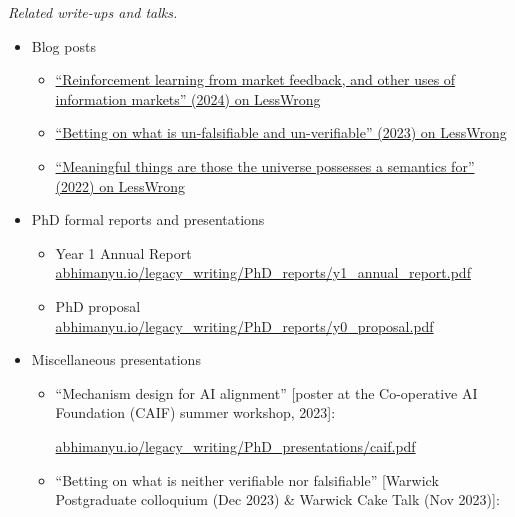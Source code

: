 \documentclass{article}
\newenvironment{relatedwork}
   {
     \begin{mdframed}[
       leftmargin=1cm,
       rightmargin=0cm,
       innerleftmargin=10pt,
       innerrightmargin=0pt,
       innertopmargin=0.5em,
       innerbottommargin=0.5em,
       linewidth=1pt,
       linecolor=gray,
       topline=false,
       bottomline=false,
       rightline=false
     ]
     \footnotesize
   }
   {
     \end{mdframed}
   }
\begin{document}
\begin{relatedwork}
    \emph{Related write-ups and talks.}
    \begin{itemize}[label=—]
        \item Blog posts
              \begin{itemize}
                  \item \href{https://www.lesswrong.com/posts/Y79tkWhvHi8GgLN2q/reinforcement-learning-from-market-feedback-and-other-uses}{``Reinforcement learning from market feedback, and other uses of information markets'' (2024) on LessWrong}
                  \item \href{https://www.lesswrong.com/posts/id84oe3LxdzoqinKA/betting-on-what-is-un-falsifiable-and-un-verifiable}{``Betting on what is un-falsifiable and un-verifiable'' (2023) on LessWrong}
                  \item \href{https://www.lesswrong.com/posts/xqxXrAohXSD3akYCg/meaningful-things-are-those-the-universe-possesses-a}{``Meaningful things are those the universe possesses a semantics for'' (2022) on LessWrong}
              \end{itemize}
        \item PhD formal reports and presentations
              \begin{itemize}
                  \item Year 1 Annual Report \href{https://abhimanyu.io/legacy_writing/PhD_reports/y1_annual_report.pdf}{abhimanyu.io/legacy\_writing/PhD\_reports/y1\_annual\_report.pdf}
                  \item PhD proposal \href{https://abhimanyu.io/legacy_writing/PhD_reports/y0_proposal.pdf}{abhimanyu.io/legacy\_writing/PhD\_reports/y0\_proposal.pdf}
              \end{itemize}
        \item Miscellaneous presentations
              \begin{itemize}
                  \item ``Mechanism design for AI alignment'' [poster at the Co-operative AI Foundation (CAIF) summer workshop, 2023]:

                        \href{https://abhimanyu.io/legacy_writing/PhD_presentations/caif.pdf}{abhimanyu.io/legacy\_writing/PhD\_presentations/caif.pdf}

                  \item ``Betting on what is neither verifiable nor falsifiable'' [Warwick Postgraduate colloquium (Dec 2023) \& Warwick Cake Talk (Nov 2023)]:


\end{itemize}
\end{itemize}
\end{relatedwork}
\end{document}
